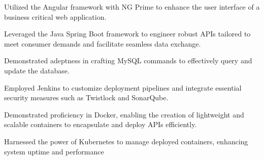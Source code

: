 \begin{cventries}
    {
      \begin{cvitems} %
        \item {Utilized the Angular framework with NG Prime to enhance the user interface of a business critical web application.}
        \item {Leveraged the Java Spring Boot framework to engineer robust APIs tailored to meet consumer demands and facilitate seamless data exchange.}
        \item {Demonstrated adeptness in crafting MySQL commands to effectively query and update the database.}
        \item {Employed Jenkins to customize deployment pipelines and integrate essential security measures such as Twistlock and SonarQube.}
        \item {Demonstrated proficiency in Docker, enabling the creation of lightweight and scalable containers to encapsulate and deploy APIs efficiently.}
        \item {Harnessed the power of Kubernetes to manage deployed containers, enhancing system uptime and performance}
      \end{cvitems}
    }

\end{cventries}
